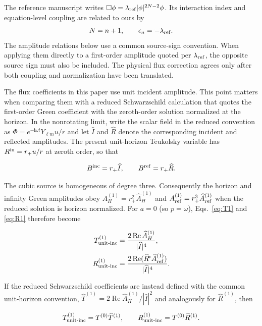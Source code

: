 \documentclass[aps,prd,twocolumn,10pt,nofootinbib,superscriptaddress,floatfix]{revtex4-2}
\newcommand{\ii}{\mathrm{i}}
\begin{document}
The reference manuscript\cite{HeTianZhangManuscript2026} writes
$\Box\phi=\lambda_{\rm ref}|\phi|^{2N-2}\phi$.  Its interaction index
and equation-level coupling are related to ours by
\begin{equation}
N=n+1,\qquad \epsilon_n=-\lambda_{\rm ref}.
\end{equation}
The amplitude relations below use a common source-sign convention.
When applying them directly to a first-order amplitude quoted per
$\lambda_{\rm ref}$, the opposite source sign must also be included.
The physical flux correction agrees only after both coupling and
normalization have been translated.


The flux coefficients in this paper use unit incident amplitude.  This
point matters when comparing them with a reduced Schwarzschild calculation
that quotes the first-order Green coefficient with the zeroth-order solution
normalized at the horizon.  In the nonrotating limit, write the scalar field
in the reduced convention as $\Phi=e^{-\ii\omega t}Y_{\ell m}u/r$ and let
$\widehat I$ and $\widehat R$ denote the corresponding incident and reflected
amplitudes.  The present unit-horizon Teukolsky variable has
$R^{\rm in}=r_+u/r$ at zeroth order, so that

\begin{equation}
B^{\rm inc}=r_+\widehat I,\qquad
B^{\rm ref}=r_+\widehat R .
\end{equation}

The cubic source is homogeneous of degree three.  Consequently the horizon
and infinity Green amplitudes obey
$A_H^{(1)}=r_+^2\widehat A_H^{(1)}$ and
$A_{\rm ref}^{(1)}=r_+^3\widehat A_{\rm ref}^{(1)}$ when the reduced solution is
horizon normalized.  For $a=0$ (so $p=\omega$), Eqs.~\eqref{eq:T1} and
\eqref{eq:R1} therefore become

\begin{align}
T_{\rm unit\text{-}inc}^{(1)}
&=\frac{2\operatorname{Re}\widehat A_H^{(1)}}{|\widehat I|^4},
\\
R_{\rm unit\text{-}inc}^{(1)}
&=\frac{2\operatorname{Re}
 (\widehat R^{\!*}\widehat A_{\rm ref}^{(1)})}{|\widehat I|^4}.
\end{align}

If the reduced Schwarzschild coefficients are instead defined with the common
unit-horizon convention,
$\widehat T^{(1)}=2\operatorname{Re}\widehat A_H^{(1)}/|\widehat I|^2$
and analogously for $\widehat R^{(1)}$, then

\begin{equation}
T_{\rm unit\text{-}inc}^{(1)}=T^{(0)}\widehat T^{(1)},
\qquad
R_{\rm unit\text{-}inc}^{(1)}=T^{(0)}\widehat R^{(1)}.
\end{equation}
\end{document}
